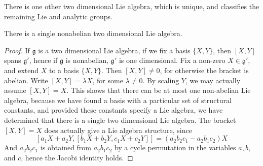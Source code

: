 There is one other two dimensional Lie algebra, which is unique, and classifies the remaining Lie and analytic groups.

\begin{theorem}
    There is a single nonabelian two dimensional Lie algebra.
\end{theorem}
\begin{proof}
    If $\mathfrak{g}$ is a two dimensional Lie algebra, if we fix a basis $\{ X,Y \}$, then $[X,Y]$ spans $\mathfrak{g}'$, hence if $\mathfrak{g}$ is nonabelian, $\mathfrak{g}'$ is one dimensional. Fix a non-zero $X \in \mathfrak{g}'$, and extend $X$ to a basis $\{ X, Y \}$. Then $[X,Y] \neq 0$, for otherwise the bracket is abelian. Write $[X,Y] = \lambda X$, for some $\lambda \neq 0$. By scaling $Y$, we may actually assume $[X,Y] = X$. This shows that there can be at most one non-abelian Lie algebra, because we have found a basis with a particular set of structural constants, and provided these constants specify a Lie algebra, we have determined that there is a single two dimensional Lie algebra. The bracket $[X,Y] = X$ does actually give a Lie algebra structure, since
    \[ [a_1X + a_2Y, [b_1X + b_2Y, c_1X + c_2Y]] = (a_2b_2c_1 - a_2b_1c_2) X \]
    And $a_2b_2c_1$ is obtained from $a_2b_1c_2$ by a cycle permutation in the variables $a,b$, and $c$, hence the Jacobi identity holds.
\end{proof}

